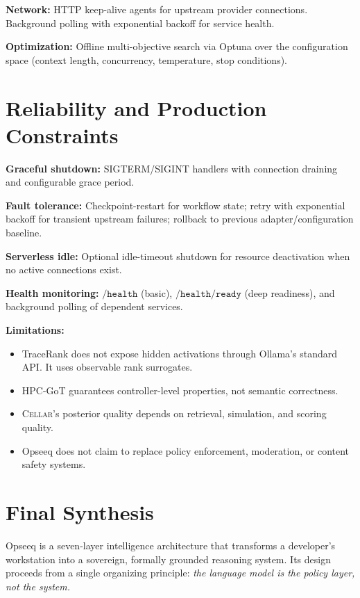 \documentclass[11pt]{article}
\theoremstyle{remark}
\newcommand{\cellar}{\textsc{Cellar}}
\begin{document}
\textbf{Network:} HTTP keep-alive agents for upstream provider connections. Background polling with exponential backoff for service health.

\textbf{Optimization:} Offline multi-objective search via Optuna over the configuration space (context length, concurrency, temperature, stop conditions).

\section{Reliability and Production Constraints}
\label{sec:reliability}

\textbf{Graceful shutdown:} SIGTERM/SIGINT handlers with connection draining and configurable grace period.

\textbf{Fault tolerance:} Checkpoint-restart for workflow state; retry with exponential backoff for transient upstream failures; rollback to previous adapter/configuration baseline.

\textbf{Serverless idle:} Optional idle-timeout shutdown for resource deactivation when no active connections exist.

\textbf{Health monitoring:} $\texttt{/health}$ (basic), $\texttt{/health/ready}$ (deep readiness), and background polling of dependent services.

\textbf{Limitations:}
\begin{itemize}
  \item TraceRank does not expose hidden activations through Ollama's standard API. It uses observable rank surrogates.
  \item HPC-GoT guarantees controller-level properties, not semantic correctness.
  \item \cellar{}'s posterior quality depends on retrieval, simulation, and scoring quality.
  \item Opseeq does not claim to replace policy enforcement, moderation, or content safety systems.
\end{itemize}

\section{Final Synthesis}
\label{sec:conclusion}

Opseeq is a seven-layer intelligence architecture that transforms a developer's workstation into a sovereign, formally grounded reasoning system. Its design proceeds from a single organizing principle: \emph{the language model is the policy layer, not the system.}
\end{document}
